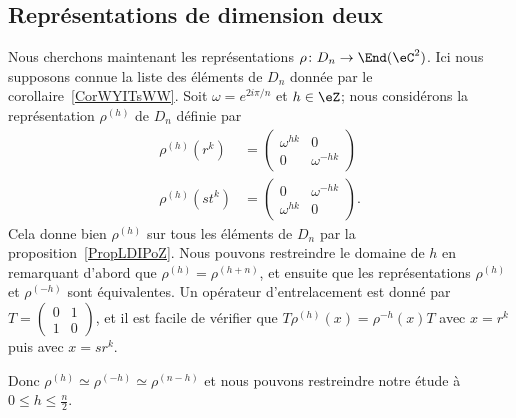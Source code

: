 \subsection{Représentations de dimension deux}

Nous cherchons maintenant les représentations \( \rho\colon D_n\to \End(\eC^2)\). Ici nous supposons connue la liste des éléments de \( D_n\) donnée par le corollaire~\ref{CorWYITsWW}. Soit \( \omega= e^{2i\pi/n}\) et \( h\in \eZ\); nous considérons la représentation \( \rho^{(h)}\) de \( D_n\) définie par
\begin{subequations}
    \begin{align}
        \rho^{(h)}(r^k)&=\begin{pmatrix}
            \omega^{hk}    &   0    \\
            0    &   \omega^{-hk}
        \end{pmatrix}\\
        \rho^{(h)}(st^k)&=\begin{pmatrix}
            0    &   \omega^{-hk}    \\
            \omega^{hk}    &   0
        \end{pmatrix}.
    \end{align}
\end{subequations}
Cela donne bien \( \rho^{(h)}\) sur tous les éléments de \( D_n\) par la proposition~\ref{PropLDIPoZ}. Nous pouvons restreindre le domaine de \( h\) en remarquant d'abord que \( \rho^{(h)}=\rho^{(h+n)}\), et ensuite que les représentations \( \rho^{(h)}\) et \( \rho^{(-h)}\) sont équivalentes. Un opérateur d'entrelacement est donné par \( T=\begin{pmatrix}
    0    &   1    \\
    1    &   0
\end{pmatrix}\), et il est facile de vérifier que \( T\rho^{(h)}(x)=\rho^{-h}(x)T\) avec \( x=r^k\) puis avec \( x=sr^k\).

Donc \( \rho^{(h)}\simeq\rho^{(-h)}\simeq\rho^{(n-h)}\) et nous pouvons restreindre notre étude à \( 0\leq h\leq \frac{ n }{2}\).

